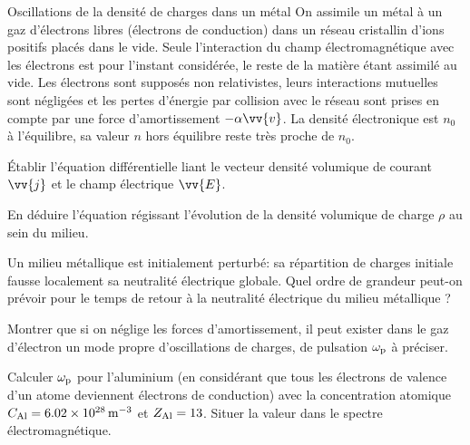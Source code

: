 \begin{exo}[PC]{Oscillations de la densité de charges dans un métal}
On assimile un métal à un gaz d'électrons libres (électrons de conduction) dans un réseau cristallin d'ions positifs placés dans le vide. Seule l'interaction du champ électromagnétique avec les électrons est pour l'instant considérée, le reste de la matière étant assimilé au vide. Les électrons sont supposés non relativistes, leurs interactions mutuelles sont négligées et les pertes d'énergie par collision avec le réseau sont prises en compte par une force d'amortissement $-\alpha\vv{v}$. La densité électronique est $n_0$ à l'équilibre, sa valeur $n$ hors équilibre reste très proche de $n_0$.
\begin{quest}
\item Établir l'équation différentielle liant le vecteur densité volumique de courant $\vv{j}$ et le champ électrique $\vv{E}$.
\item En déduire l'équation régissant l'évolution de la densité volumique de charge $\rho$ au sein du milieu.
\item Un milieu métallique est initialement perturbé: sa répartition de charges initiale fausse localement sa neutralité électrique globale. Quel ordre de grandeur peut-on prévoir pour le temps de retour à la neutralité électrique du milieu métallique ?
\item Montrer que si on néglige les forces d'amortissement, il peut exister dans le gaz d'électron un mode propre d'oscillations de charges, de pulsation $\omega_{\rm{p}}$ à préciser.
\item Calculer $\omega_{\rm{p}}$ pour l'aluminium (en considérant que tous les électrons de valence d'un atome deviennent électrons de conduction) avec la concentration atomique $C_{\rm{Al}}=\SI{6,02e28}{m^{-3}}$ et $Z_{\rm{Al}}=13$. Situer la valeur dans le spectre électromagnétique.
\end{quest}
\end{exo}

